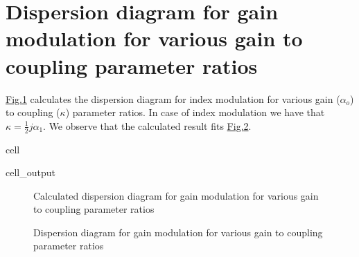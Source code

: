 \documentclass[a4paper,10pt,english,openany,oneside]{jupyterBook}
\begin{document}
\section{Dispersion diagram for gain modulation for various gain to coupling parameter ratios}
\label{\detokenize{Kogelnik-Shank_Coupled-Wave-Theory_DFB-Lasers:dispersion-diagram-for-gain-modulation-for-various-gain-to-coupling-parameter-ratios}}
\sphinxAtStartPar
\hyperref[\detokenize{Kogelnik-Shank_Coupled-Wave-Theory_DFB-Lasers:kogelnik3}]{Fig.\@ \ref{\detokenize{Kogelnik-Shank_Coupled-Wave-Theory_DFB-Lasers:kogelnik3}}} calculates the dispersion diagram for index modulation for various gain (\(\alpha_o\)) to coupling (\(\kappa\)) parameter ratios. In case of index modulation we have that \(\kappa= \frac{1}{2} j \alpha_1\). We observe that the calculated result fits \hyperref[\detokenize{Kogelnik-Shank_Coupled-Wave-Theory_DFB-Lasers:kogelnik4}]{Fig.\@ \ref{\detokenize{Kogelnik-Shank_Coupled-Wave-Theory_DFB-Lasers:kogelnik4}}}.

\begin{sphinxuseclass}{cell}\begin{sphinxVerbatimOutput}

\begin{sphinxuseclass}{cell_output}
\begin{figure}[htbp]
\centering
\capstart

\noindent{}
\caption{Calculated dispersion diagram for gain modulation for various gain to coupling parameter ratios}\label{\detokenize{Kogelnik-Shank_Coupled-Wave-Theory_DFB-Lasers:kogelnik3}}\end{figure}

\end{sphinxuseclass}\end{sphinxVerbatimOutput}

\end{sphinxuseclass}
\begin{figure}[htbp]
\centering
\capstart

\noindent{}
\caption{Dispersion diagram for gain modulation for various gain to coupling parameter ratios}\label{\detokenize{Kogelnik-Shank_Coupled-Wave-Theory_DFB-Lasers:kogelnik4}}\end{figure}
\end{document}
